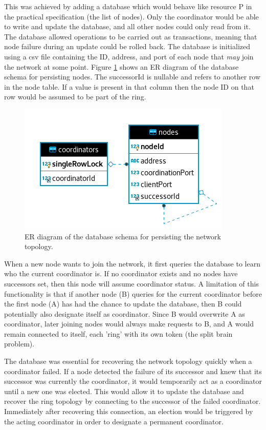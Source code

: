\documentclass[12pt]{article}
\begin{document}
This was achieved by adding a database which would behave like resource P in the practical specification (the list of nodes). Only the coordinator would be able to write and update the database, and all other nodes could only read from it. The database allowed operations to be carried out as transactions, meaning that node failure during an update could be rolled back. The database is initialized using a csv file containing the ID, address, and port of each node that \emph{may} join the network at some point. Figure \ref{fig:er} shows an ER diagram of the database schema for persisting nodes. The successorId is nullable and refers to another row in the node table. If a value is present in that column then the node ID on that row would be assumed to be part of the ring.

\begin{figure}[!ht]
	\centering
	\includegraphics[width=0.6\linewidth]{images/er}
	\caption{ER diagram of the database schema for persisting the network topology.}
	\label{fig:er}
\end{figure}

When a new node wants to join the network, it first queries the database to learn who the current coordinator is. If no coordinator exists and no nodes have successors set, then this node will assume coordinator status. A limitation of this functionality is that if another node (B) queries for the current coordinator before the first node (A) has had the chance to update the database, then B could potentially also designate itself as coordinator. Since B would overwrite A as coordinator, later joining nodes would always make requests to B, and A would remain connected to itself, each 'ring' with its own token (the split brain problem).

The database was essential for recovering the network topology quickly when a coordinator failed. If a node detected the failure of its successor and knew that its successor was currently the coordinator, it would temporarily act as a coordinator until a new one was elected. This would allow it to update the database and recover the ring topology by connecting to the successor of the failed coordinator. Immediately after recovering this connection, an election would be triggered by the acting coordinator in order to designate a permanent coordinator.
\end{document}
